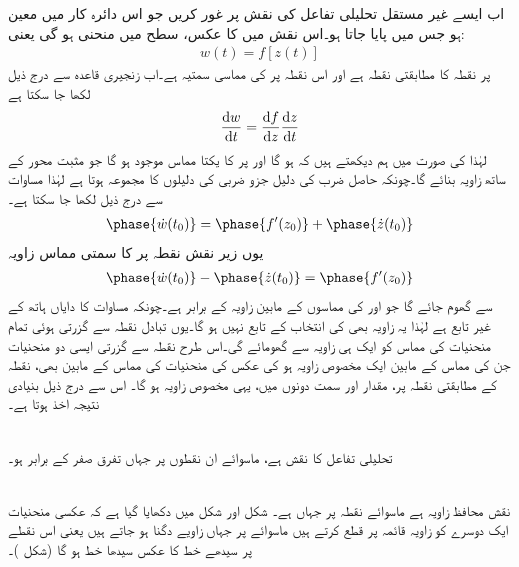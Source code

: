 اب ایسے غیر مستقل تحلیلی تفاعل  کی نقش پر غور کریں جو اس دائرہ کار میں معین ہو جس میں  پایا جاتا ہو۔اس نقش میں  کا عکس،  سطح  میں منحنی  ہو گی یعنی:
\begin{align*}
w(t)=f[z(t)]
\end{align*}
 پر نقطہ  کا مطابقتی نقطہ  ہے اور  اس نقطہ پر  کی مماسی سمتیہ ہے۔اب زنجیری قاعدہ سے درج ذیل لکھا جا سکتا ہے
\begin{align}\label{مساوات_نقش_عمومی_منحنی_پ}
\frac{\dif w}{\dif t}=\frac{\dif f}{\dif z}\frac{\dif z}{\dif t}
\end{align}
لہٰذا  کی صورت میں ہم دیکھتے ہیں کہ  ہو گا اور  پر  کا یکتا مماس موجود ہو گا جو مثبت  محور کے ساتھ  زاویہ بنائے گا۔چونکہ حاصل ضرب کی دلیل جزو ضربی کی  دلیلوں  کا مجموعہ ہوتا ہے لہٰذا مساوات  سے درج ذیل لکھا جا سکتا ہے۔
\begin{align*}
\phase{\dot{w}(t_0)}=\phase{f'(z_0)}+\phase{\dot{z}(t_0)}
\end{align*}
یوں زیر نقش نقطہ  پر  کا سمتی مماس زاویہ
\begin{align}\label{مساوات_نقش_عمومی_منحنی_ت}
\phase{\dot{w}(t_0)}-\phase{\dot{z}(t_0)}=\phase{f'(z_0)}
\end{align}
سے گھوم جائے گا جو  اور  کی  مماسوں کے مابین زاویہ کے برابر ہے۔چونکہ مساوات  کا دایاں ہاتھ  کے غیر تابع ہے لہٰذا یہ زاویہ بھی  کی انتخاب کے تابع نہیں ہو گا۔یوں تبادل  نقطہ  سے گزرتی ہوئی تمام منحنیات کی مماس کو ایک ہی زاویہ  سے گھومائے گی۔اس طرح نقطہ  سے گزرتی ایسی دو منحنیات جن کی مماس کے مابین ایک مخصوص زاویہ ہو کی عکس کی منحنیات کی مماس کے مابین بھی، نقطہ  کے مطابقتی نقطہ  پر، مقدار اور سمت دونوں میں، یہی مخصوص زاویہ ہو گا۔ اس سے درج ذیل بنیادی نتیجہ اخذ ہوتا ہے۔

\quad {}\\
تحلیلی تفاعل  کا نقش  ہے، ماسوائے ان نقطوں پر جہاں تفرق  صفر کے برابر ہو۔ 

\quad {}\\
نقش  محافظ زاویہ ہے ماسوائے نقطہ  پر جہاں  ہے۔ شکل  اور شکل  میں دکھایا گیا ہے کہ عکسی منحنیات ایک دوسرے کو زاویہ قائمہ پر قطع کرتے ہیں ماسوائے  پر جہاں زاویے دگنا ہو جاتے ہیں یعنی اس نقطے پر سیدھے خط  کا عکس سیدھا خط  ہو گا (شکل )۔ 

